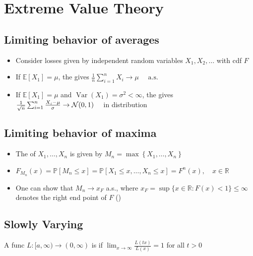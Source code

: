 \section{Extreme Value Theory}


\subsection*{Limiting behavior of averages}
\begin{itemize}[leftmargin=*]
    \item Consider losses given by independent random variables $X_{1}, X_{2}, \ldots$ with cdf $F$
    \item If $\mathbb{E}\left[X_{1}\right]=\mu$, the  gives
$
\frac{1}{n} \sum_{i=1}^{n} X_{i} \rightarrow \mu \quad \text { a.s. }
$
    \item If $\mathbb{E}\left[X_{1}\right]=\mu$ and $\operatorname{Var}\left(X_{1}\right)=\sigma^{2}<\infty$, the  gives $\frac{1}{\sqrt{n}} \sum_{i=1}^{n} \frac{X_{i}-\mu}{\sigma} \rightarrow \operatorname{\mathcal{N}}(0,1) \quad$ in distribution
\end{itemize}





\subsection*{Limiting behavior of maxima}
\begin{itemize}[leftmargin=*]
    \item The  of $X_{1}, \ldots, X_{n}$ is given by $M_{n}=\max \left\{X_{1}, \ldots, X_{n}\right\}$
    \item $F_{M_{n}}(x)=\mathbb{P}\left[M_{n} \leq x\right]=\mathbb{P}\left[X_{1} \leq x, \ldots, X_{n} \leq x\right]=F^{n}(x), \quad x \in \mathbb{R}$
    \item One can show that $M_{n} \rightarrow x_{F}$ a.s., where $x_{F}=\sup \{x \in \mathbb{R}: F(x)<1\} \leq \infty$ denotes the right end point of $F$ ()
\end{itemize}



\subsection*{Slowly Varying}
A func $L:[a, \infty) \rightarrow(0, \infty)$ is  if
$
\lim _{x \rightarrow \infty} \frac{L(t x)}{L(x)}=1$ for all $t>0
$







